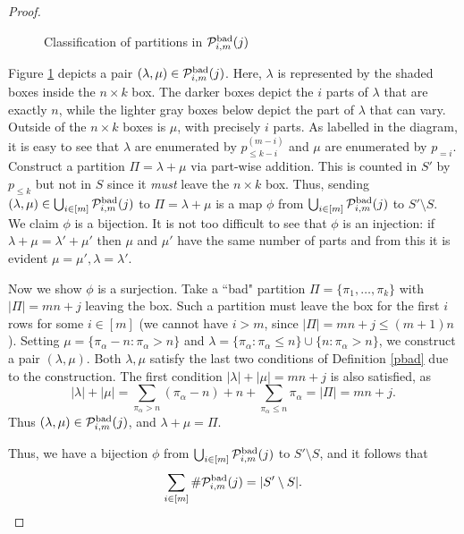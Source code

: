 \documentclass[12pt]{article}
\begin{document}
\begin{proof}
\begin{figure}[ht]
\caption{Classification of partitions in $\mathcal{P}^{\textup{bad}}_{i,m}(j)$}
\label{lemma}
\end{figure}

Figure \ref{lemma} depicts a pair $(\lambda, \mu) \in \mathcal{P}^{\textup{bad}}_{i,m}(j)$. Here, $\lambda$ is represented by the shaded boxes inside the $n \times k$ box. The darker boxes depict the $i$ parts of $\lambda$ that are exactly $n$, while the lighter gray boxes below depict the part of $\lambda$ that can vary. Outside of the $n\times k$ boxes is $\mu$, with precisely $i$ parts. As labelled in the diagram, it is easy to see that $\lambda$ are enumerated by $p_{\le k-i}^{(m-i)}$ and $\mu$ are enumerated by $p_{=i}$.
Construct a partition $\Pi = \lambda+\mu$ via part-wise addition. This is counted in $S'$ by $p_{\le k}$ but not in $S$ since it \textit{must} leave the $n\times k$ box. Thus, sending $(\lambda,\mu) \in \bigcup_{i\in [m]}{\mathcal{P}^{\textup{bad}}_{i,m}(j)}$ to $\Pi=\lambda+\mu$ is a map $\phi$ from $\bigcup_{i\in [m]}{\mathcal{P}^{\textup{bad}}_{i,m}(j)}$ to $S'\setminus S$. We claim $\phi$ is a bijection. It is not too difficult to see that $\phi$ is an injection: if $\lambda+\mu = \lambda'+\mu'$ then $\mu$ and $\mu'$ have the same number of parts and from this it is evident $\mu=\mu', \lambda=\lambda'$.

Now we show $\phi$ is a surjection. Take a ``bad" partition $\Pi = \{\pi_1, \ldots , \pi_k\}$ with $|\Pi|=mn+j$ leaving the box. Such a partition must leave the box for the first $i$ rows for some $i\in [m]$ (we cannot have $i>m$, since $|\Pi| = mn+j\le (m+1)n$). Setting $\mu = \{\pi_\alpha - n : \pi_\alpha>n\}$ and $\lambda = \{ \pi_\alpha : \pi_\alpha \le n \} \cup \{n : \pi_\alpha>n\}$, we construct a pair $(\lambda, \mu)$. Both $\lambda,\mu$ satisfy the last two conditions of Definition \ref{pbad} due to the construction. The first condition $|\lambda|+|\mu|=mn+j$ is also satisfied, as
\[|\lambda|+|\mu|=\sum_{\pi_\alpha>n}{(\pi_\alpha-n)+n}+\sum_{\pi_\alpha\le n}{\pi_\alpha}=|\Pi|=mn+j.\]
Thus $(\lambda,\mu) \in \mathcal{P}^{\textup{bad}}_{i,m}(j)$, and $\lambda+\mu=\Pi$.

Thus, we have a bijection $\phi$ from $\bigcup_{i\in [m]}{\mathcal{P}^{\textup{bad}}_{i,m}(j)}$ to $S'\setminus S$, and it follows that 
\[\sum_{i\in [m]}{\#\mathcal{P}^{\textup{bad}}_{i,m}(j)}=|S'\setminus S|.\] \end{proof}
\end{document}
